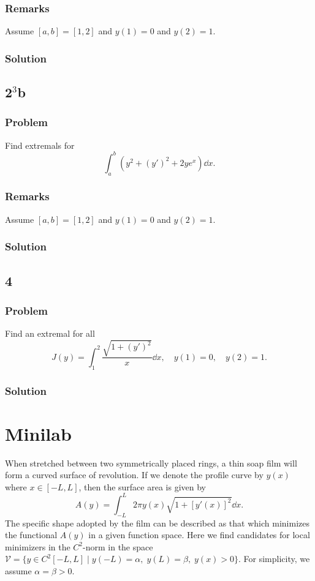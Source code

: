 \documentclass[12pt,twoside]{article}
\begin{document}
\subsubsection*{Remarks}
Assume $[a,b]=[1,2]$ and $y(1)=0$ and $y(2)=1$.

\subsubsection*{Solution}
\todo{}

\subsection{2$^3$b}
\subsubsection*{Problem}
Find extremals for
\begin{equation}
  \label{eq:4.3.2b-problem}
  \int_a^b(y^2+{(y')}^2 + 2ye^x)\dd{x}.
\end{equation}

\subsubsection*{Remarks}
Assume $[a,b]=[1,2]$ and $y(1)=0$ and $y(2)=1$.
\subsubsection*{Solution}
\todo{}

\subsection{4}
\subsubsection*{Problem}
Find an extremal for all
\begin{equation}
  \label{eq:4.3.4-problem}
  J(y) = \int_1^2\frac{\sqrt{1+{(y')}^2}}{x}\dd{x},\quad y(1)=0,\quad y(2)=1.
\end{equation}
\subsubsection*{Solution}
\todo{}

\section{Minilab}
When stretched between two symmetrically placed rings, a thin soap film will
form a curved surface of revolution. If we denote the profile curve by $y(x)$
where $x\in[-L,L]$, then the surface area is given by
\begin{equation}
  \label{eq:minilab-surface-area}
  A(y)=\int_{-L}^L 2\pi y(x) \sqrt{1 + {\left[ y'(x) \right]}^2}\dd{x}.
\end{equation}
The specific shape adopted by the film can be described as that which minimizes
the functional $A(y)$ in a given function space. Here we find candidates for
local minimizers in the $C^2$-norm in the space $\mathcal{V}=\{y\in
C^2[-L,L]\;|\;y(-L)=\alpha,\;y(L)=\beta,\;y(x)>0\}$. For simplicity, we assume
$\alpha=\beta>0$.
\end{document}
